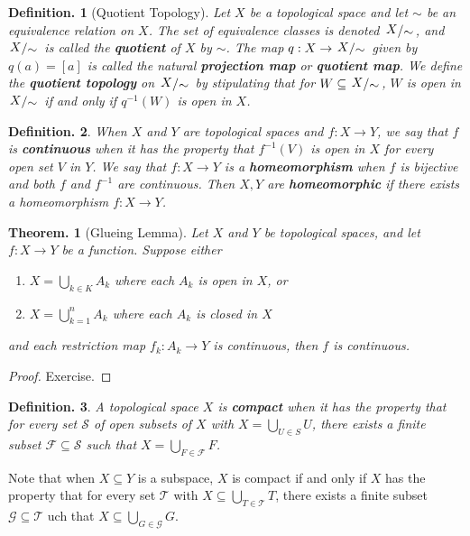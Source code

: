\documentclass[11pt, a4paper]{memoir}
\theoremstyle{change}
\newtheorem{theorem}{Theorem.}[section]
\theoremstyle{plain}
\theoremstyle{nonumberplain}
\newtheorem{definition}{Definition.}
\newtheorem{proof}{Proof}
\newcommand{\quot}[2]{\mathchoice{\left.\raisebox{0.14em}{$#1$}\middle/\raisebox{-0.14em}{$#2$}\right.}
                                 {\left.\raisebox{0.08em}{$#1$}\middle/\raisebox{-0.08em}{$#2$}\right.}
                                 {\left.\raisebox{0.03em}{$#1$}\middle/\raisebox{-0.03em}{$#2$}\right.}
                                 {\left.\raisebox{0em}{$#1$}\middle/\raisebox{0em}{$#2$}\right.}}
\numberwithin{equation}{section}
\begin{document}
\begin{definition}[Quotient Topology]
    Let $X$ be a topological space and let $\sim$ be an equivalence relation on $X$.
    The set of equivalence classes is denoted $\quot{X}{\sim}$, and $\quot{X}{\sim}$ is called the \textbf{quotient} of $X$ by $\sim$.
    The map $q:X\to\quot{X}{\sim}$ given by $q(a)=[a]$ is called the natural \textbf{projection map} or \textbf{quotient map}.
    We define the \textbf{quotient topology} on $\quot{X}{\sim}$ by stipulating that for $W\subseteq \quot{X}{\sim}$, $W$ is open in $\quot{X}{\sim}$ if and only if $q^{-1}(W)$ is open in $X$.
\end{definition}
\begin{definition}
    When $X$ and $Y$ are topological spaces and $f:X\to Y$, we say that $f$ is \textbf{continuous} when it has the property that $f^{-1}(V)$ is open in $X$ for every open set $V$ in $Y$.
    We say that $f:X\to Y$ is a \textbf{homeomorphism} when $f$ is bijective and both $f$ and $f^{-1}$ are continuous.
    Then $X,Y$ are \textbf{homeomorphic} if there exists a homeomorphism $f:X\to Y$.
\end{definition}
\begin{theorem}[Glueing Lemma]
    Let $X$ and $Y$ be topological spaces, and let $f:X\to Y$ be a function.
    Suppose either
    \begin{enumerate}[nl,r]
        \item $X=\bigcup_{k\in K}A_k$ where each $A_k$ is open in $X$, or
        \item $X=\bigcup_{k=1}^nA_k$ where each $A_k$ is closed in $X$
    \end{enumerate}
    and each restriction map $f_k:A_k\to Y$ is continuous, then $f$ is continuous.
\end{theorem}
\begin{proof}
    Exercise.
\end{proof}
\begin{definition}
    A topological space $X$ is \textbf{compact} when it has the property that for every set $\mathcal{S}$ of open subsets of $X$ with $X=\bigcup_{U\in S}U$, there exists a finite subset $\mathcal{F}\subseteq \mathcal{S}$ such that $X=\bigcup_{F\in\mathcal{F}}F$.
\end{definition}
Note that when $X\subseteq Y$ is a subspace, $X$ is compact if and only if $X$ has the property that for every set $\mathcal{T}$ with $X\subseteq\bigcup_{T\in\mathcal{T}}T$, there exists a finite subset $\mathcal{G}\subseteq\mathcal{T}$ uch that $X\subseteq\bigcup_{G\in\mathcal{G}}G$.
\end{document}
